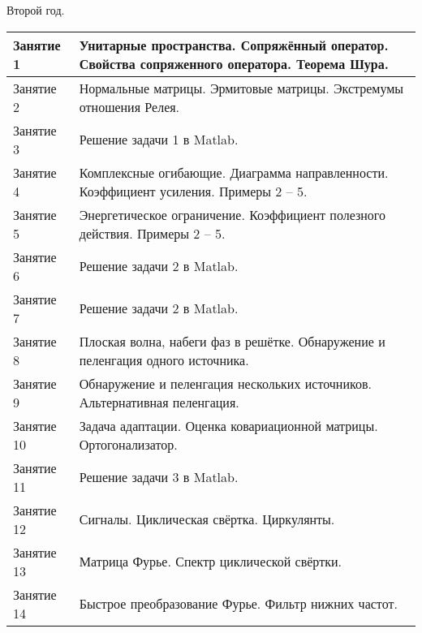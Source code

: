 Второй год.

{
\center
\begin{tabular}{|p{3cm}|p{12cm}|}
    \hline
    Занятие 1  & Унитарные пространства. Сопряжённый оператор. Свойства сопряженного оператора. Теорема Шура. \\
    \hline
    Занятие 2  & Нормальные матрицы. Эрмитовые матрицы. Экстремумы отношения Релея.                           \\
    \hline
    Занятие 3  & Решение задачи 1 в Matlab.                                                                   \\
    \hline
    Занятие 4  & Комплексные огибающие. Диаграмма направленности. Коэффициент усиления. Примеры 2 -- 5.       \\
    \hline
    Занятие 5  & Энергетическое ограничение. Коэффициент полезного действия. Примеры 2 -- 5.                  \\
    \hline
    Занятие 6  & Решение задачи 2 в Matlab.                                                                   \\
    \hline
    Занятие 7  & Решение задачи 2 в Matlab.                                                                   \\
    \hline
    Занятие 8  & Плоская волна, набеги фаз в решётке. Обнаружение и пеленгация одного источника.              \\
    \hline
    Занятие 9  & Обнаружение и пеленгация нескольких источников. Альтернативная пеленгация.                   \\
    \hline
    Занятие 10  & Задача адаптации. Оценка ковариационной матрицы. Ортогонализатор.                            \\
    \hline
    Занятие 11 & Решение задачи 3 в Matlab.                                                                   \\
    \hline
    Занятие 12 & Сигналы. Циклическая свёртка. Циркулянты.                                                    \\
    \hline
    Занятие 13 & Матрица Фурье. Спектр циклической свёртки.                                                   \\
    \hline
    Занятие 14 & Быстрое преобразование Фурье. Фильтр нижних частот.                                          \\
    \hline
\end{tabular}
\par
}
